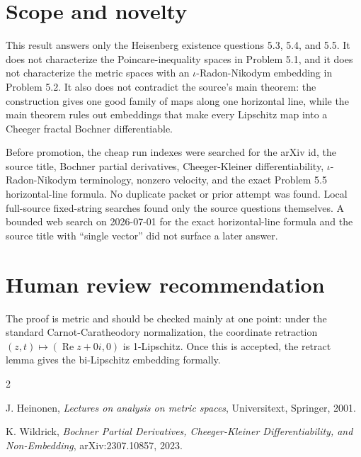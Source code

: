 \documentclass[11pt]{amsart}
\newcommand{\Repart}{\operatorname{Re}}
\begin{document}
\section*{Scope and novelty}

This result answers only the Heisenberg existence questions 5.3, 5.4, and 5.5.
It does not characterize the Poincare-inequality spaces in Problem 5.1, and it
does not characterize the metric spaces with an $\iota$-Radon-Nikodym embedding
in Problem 5.2.  It also does not contradict the source's main theorem: the
construction gives one good family of maps along one horizontal line, while the
main theorem rules out embeddings that make every Lipschitz map into a Cheeger
fractal Bochner differentiable.

Before promotion, the cheap run indexes were searched for the arXiv id, the
source title, Bochner partial derivatives, Cheeger-Kleiner differentiability,
$\iota$-Radon-Nikodym terminology, nonzero velocity, and the exact
Problem 5.5 horizontal-line formula.  No duplicate packet or prior attempt was
found.  Local full-source fixed-string searches found only the source
questions themselves.  A bounded web search on 2026-07-01 for the exact
horizontal-line formula and the source title with ``single vector'' did not
surface a later answer.

\section*{Human review recommendation}

The proof is metric and should be checked mainly at one point: under the
standard Carnot-Caratheodory normalization, the coordinate retraction
$(z,t)\mapsto(\Repart z+0i,0)$ is 1-Lipschitz.  Once this is accepted, the
retract lemma gives the bi-Lipschitz embedding formally.

\begin{thebibliography}{2}

J. Heinonen,
\emph{Lectures on analysis on metric spaces},
Universitext, Springer, 2001.

K. Wildrick,
\emph{Bochner Partial Derivatives, Cheeger-Kleiner Differentiability, and
Non-Embedding},
arXiv:2307.10857, 2023.

\end{thebibliography}
\end{document}
